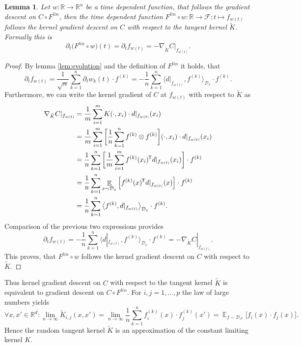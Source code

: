 \documentclass[11pt, a4paper]{article}
\newtheorem{lemma}[theorem]{Lemma}
\newcommand{\R}{\mathbb{R}}
\newcommand{\D}{\mathcal{D}}
\newcommand{\F}{\mathcal{F}}
\newcommand*{\tr}{^{\mkern-1.5mu\mathsf{T}}}
\DeclareMathOperator*{\E}{\mathbb{E}}
\begin{document}
\begin{lemma}
Let $w: \R \to \R^n$ be a time dependent function, that follows the gradient descent on $C \circ F^\textit{lin}$, then the time dependent function $F^\textit{lin} \circ w : \R \to \F : t \mapsto f_{w(t)}$ follows the kernel gradient descent on $C$ with respect to the tangent kernel $\tilde{K}$. Formally this is
\[ \partial_t \big (F^\textit{lin} \circ w \big )(t) = \partial_tf_{w(t)} = -\nabla_{\tilde{K}}C|_{f_{w(t)}}. \]
\end{lemma}

\begin{proof}
By lemma \ref{lem:evolution} and the definition of $F^\textit{lin}$ it holds, that 
\[ \partial_tf_{w(t)} = \frac{1}{\sqrt{n}} \sum_{k=1}^{n} \partial_t w_k(t) \cdot f^{(k)} = - \frac{1}{n} \sum_{k=1}^{n} \big \langle d|_{f_{w(t)}}, f^{(k)} \big \rangle_{\D_x} \cdot f^{(k)}. \]
Furthermore, we can write the kernel gradient of $C$ at $f_{w(t)}$ with respect to $\tilde{K}$ as
\[ \begin{split}
\nabla_{\tilde{K}} C|_{f_{w(t)}}
&= \frac{1}{m} \sum_{i=1}^{m} K(\cdot,x_i) \cdot d|_{f_{w(t)}}(x_i) \\\
&= \frac{1}{m} \sum_{i=1}^{m} \bigg [ \frac{1}{n} \sum_{k=1}^{n}f^{(k)} \otimes f^{(k)} \bigg ] (\cdot,x_i) \cdot d|_{f_{w(t)}}(x_i) \\\
&= \frac{1}{n} \sum_{k=1}^{n} \bigg [ \frac{1}{m} \sum_{i=1}^{m} f^{(k)}(x_i)	\tr  d|_{f_{w(t)}}(x_i) \bigg ] \cdot f^{(k)} \\\
&= \frac{1}{n} \sum_{k=1}^{n} \E_{x \sim \D_x} \Big [ f^{(k)}(x)\tr  d|_{f_{w(t)}}(x) \Big ] \cdot f^{(k)} \\\
&= \frac{1}{n} \sum_{k=1}^{n} \big \langle f^{(k)}, d|_{f_{w(t)}} \big \rangle_{\D_x} \cdot f^{(k)}.
\end{split} \]
Comparison of the previous two expressions provides
\[ \partial_tf_{w(t)} = - \frac{1}{n} \sum_{k=1}^{n} \big \langle d|_{f_{w(t)}}, f^{(k)} \big \rangle_{\D_x} \cdot f^{(k)} = -\nabla_{\tilde{K}} C|_{f_{w(t)}}. \]
This proves, that $F^\textit{lin} \circ w$ follows the kernel gradient descent on $C$ with respect to $\tilde{K}$.
\end{proof}

Thus kernel gradient descent on $C$ with respect to the tangent kernel $\tilde{K}$ is equivalent to gradient descent on $C \circ F^\textit{lin}$. For $i,j = 1, \dots, p$ the law of large numbers yields
\[ \forall x,x' \in \R^d : \lim_{n \to \infty} \tilde{K}_{i,j}(x,x') = \lim_{n \to \infty} \frac{1}{n} \sum_{k=1}^{n} f_i^{(k)}(x) \cdot f_j^{(k)}(x') = \E_{f \sim \D_{\F}} \Big [ f_i(x) \cdot f_j(x) \Big ]. \]
Hence the random tangent kernel $\tilde{K}$ is an approximation of the constant limiting kernel $K$.
\end{document}
